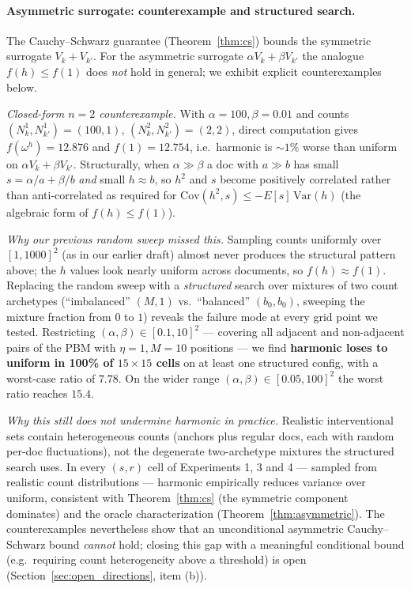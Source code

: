 \documentclass[sigconf]{acmart}
\begin{document}
\paragraph{Asymmetric surrogate: counterexample and structured search.}
The Cauchy--Schwarz guarantee (Theorem~\ref{thm:cs}) bounds the symmetric
surrogate $V_k+V_{k'}$. For the asymmetric surrogate
$\alpha V_k + \beta V_{k'}$ the analogue $f(h)\le f(1)$ does \emph{not} hold
in general; we exhibit explicit counterexamples below.

\emph{Closed-form $n=2$ counterexample.}
With $\alpha=100,\beta=0.01$ and counts $(N_k^1,N_{k'}^1)=(100,1)$,
$(N_k^2,N_{k'}^2)=(2,2)$, direct computation gives
$f(\omega^h)=12.876$ and $f(1)=12.754$, i.e.\ harmonic is $\sim 1\%$
worse than uniform on $\alpha V_k+\beta V_{k'}$.
Structurally, when $\alpha\gg\beta$ a doc with $a\gg b$ has small
$s = \alpha/a + \beta/b$ \emph{and} small $h \approx b$, so $h^2$ and $s$
become positively correlated rather than anti-correlated as required for
$\mathrm{Cov}(h^2,s)\le -E[s]\,\mathrm{Var}(h)$ (the algebraic form of
$f(h)\le f(1)$).

\emph{Why our previous random sweep missed this.}
Sampling counts uniformly over $[1,1000]^2$ (as in our earlier draft) almost
never produces the structural pattern above; the $h$ values look
nearly uniform across documents, so $f(h) \approx f(1)$. Replacing the random
sweep with a \emph{structured} search over mixtures of two count archetypes
(``imbalanced'' $(M, 1)$ vs.\ ``balanced'' $(b_0, b_0)$, sweeping the mixture
fraction from $0$ to $1$) reveals the failure mode at every grid point we
tested. Restricting $(\alpha,\beta)\in[0.1,10]^2$ — covering all adjacent
and non-adjacent pairs of the PBM with $\eta=1, M{=}10$ positions — we find
\textbf{harmonic loses to uniform in 100\% of $15{\times}15$ cells} on at
least one structured config, with a worst-case ratio of $7.78$. On the wider
range $(\alpha,\beta)\in[0.05,100]^2$ the worst ratio reaches $15.4$.

\emph{Why this still does not undermine harmonic in practice.}
Realistic interventional sets contain heterogeneous counts (anchors plus
regular docs, each with random per-doc fluctuations), not the degenerate
two-archetype mixtures the structured search uses. In every $(s,r)$ cell
of Experiments 1, 3 and 4 — sampled from realistic count distributions
— harmonic empirically reduces variance over uniform, consistent with
Theorem~\ref{thm:cs} (the symmetric component dominates) and the oracle
characterization (Theorem~\ref{thm:asymmetric}). The counterexamples
nevertheless show that an unconditional asymmetric Cauchy--Schwarz bound
\emph{cannot} hold; closing this gap with a meaningful conditional bound
(e.g.\ requiring count heterogeneity above a threshold) is open
(Section~\ref{sec:open_directions}, item (b)).
\end{document}
